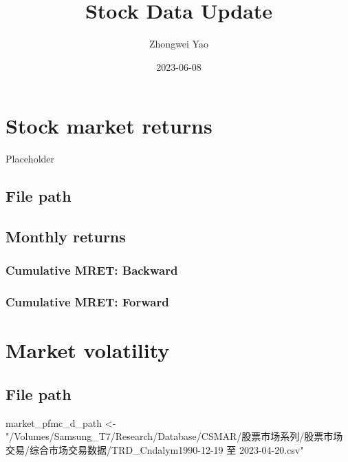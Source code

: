 \documentclass[
]{article}
\title{Stock Data Update}
\author{Zhongwei Yao}
\date{2023-06-08}
\newenvironment{Shaded}{\begin{snugshade}}{\end{snugshade}}
\newcommand{\NormalTok}[1]{#1}
\newcommand{\OtherTok}[1]{\textcolor[rgb]{0.56,0.35,0.01}{#1}}
\newcommand{\StringTok}[1]{\textcolor[rgb]{0.31,0.60,0.02}{#1}}
\begin{document}
\maketitle

{
\hypersetup{linkcolor=}
\setcounter{tocdepth}{2}
\tableofcontents
}
\listoffigures
\listoftables
\hypertarget{stock-market-returns}{%
\section{Stock market returns}\label{stock-market-returns}}

Placeholder

\hypertarget{file-path}{%
\subsection{File path}\label{file-path}}

\hypertarget{monthly-returns}{%
\subsection{Monthly returns}\label{monthly-returns}}

\hypertarget{cumulative-mret-backward}{%
\subsubsection{Cumulative MRET: Backward}\label{cumulative-mret-backward}}

\hypertarget{cumulative-mret-forward}{%
\subsubsection{Cumulative MRET: Forward}\label{cumulative-mret-forward}}

\hypertarget{market-volatility}{%
\section{Market volatility}\label{market-volatility}}

\hypertarget{file-path-1}{%
\subsection{File path}\label{file-path-1}}

\begin{Shaded}
\begin{Highlighting}[]
\NormalTok{market\_pfmc\_d\_path }\OtherTok{\textless{}{-}} \StringTok{"/Volumes/Samsung\_T7/Research/Database/CSMAR/股票市场系列/股票市场交易/综合市场交易数据/TRD\_Cndalym1990{-}12{-}19 至 2023{-}04{-}20.csv"}
\end{Highlighting}
\end{Shaded}
\end{document}
